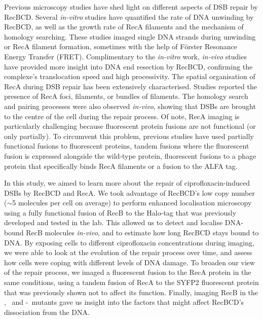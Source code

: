 Previous microscopy studies have shed light on different aspects of DSB repair by RecBCD. Several \emph{in-vitro} studies have quantified the rate of DNA unwinding by RecBCD\cite{Spies2003,Liu2013}, as well as the growth rate of RecA filaments\cite{Joo2006,Galletto2006,Handa2009} and the mechanism of homology searching\cite{Forget2012,Ragunathan2012}. These studies imaged single DNA strands during unwinding or RecA filament formation, sometimes with the help of Förster Resonance Energy Transfer (FRET)\cite{Joo2006,Ragunathan2012}. Complimentary to the \emph{in-vitro} work, \emph{in-vivo} studies have provided more insight into DNA end resection by RecBCD\cite{Wiktor2018}, confirming the complexe's translocation speed and high processivity. The spatial organisation of RecA during DSB repair has been extensively characterised. Studies reported the presence of RecA foci\cite{Renzette2005,Renzette2007,Centore2007,Amarh2018}, filaments\cite{Kidane2005}, or bundles of filaments\cite{Lesterlin2013,Ghodke2019}. The homology search and pairing processes were also observed \emph{in-vivo}, showing that DSBs are brought to the centre of the cell during the repair process\cite{Badrinarayanan2015,Wiktor2021}. Of note, RecA imaging is particularly challenging because fluorescent protein fusions are not functional (or only partially). To circumvent this problem, previous studies have used partially functional fusions to fluorescent proteins\cite{Kidane2005,Renzette2005,Renzette2007,Centore2007,Lesterlin2013,Klimova2020}, tandem fusions where the fluorescent fusion is expressed alongside the wild-type protein\cite{Amarh2018,Wiktor2021}, fluorescent fusions to a phage protein that specifically binds RecA filaments\cite{Ghodke2019} or a fusion to the ALFA tag\cite{Wiktor2021}.

In this study, we aimed to learn more about the repair of ciprofloxacin-induced DSBs by RecBCD and RecA. We took advantage of RecBCD's low copy number ($\sim$5 molecules per cell on average\cite{Lepore2019a}) to perform enhanced localisation microscopy\cite{Yu2006, Elf2007} using a fully functional fusion of RecB to the Halo-tag that was previously developed and tested in the lab\cite{Lepore2019a}. This allowed us to detect and localise DNA-bound RecB molecules \emph{in-vivo}, and to estimate how long RecBCD stays bound to DNA. By exposing cells to different ciprofloxacin concentrations during imaging, we were able to look at the evolution of the repair process over time, and assess how cells were coping with different levels of DNA damage. To broaden our view of the repair process, we imaged a fluorescent fusion to the RecA protein in the same conditions, using a tandem fusion of RecA to the SYFP2 fluorescent protein that was previously shown not to affect its function\cite{Wiktor2021}. Finally, imaging RecB in the \dreca, \teneighty\ and \dreca-\teneighty\ mutants gave us insight into the factors that might affect RecBCD's dissociation from the DNA.
